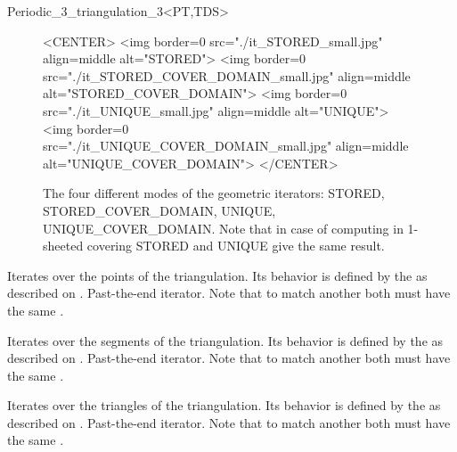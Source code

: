 \begin{ccRefClass}{Periodic_3_triangulation_3<PT,TDS>}
\begin{figure}[htbp]
\begin{ccTexOnly}
\begin{center}
\end{center}
\end{ccTexOnly}
\begin{ccHtmlOnly}
<CENTER>
<img border=0 src="./it_STORED_small.jpg" align=middle
  alt="STORED">
<img border=0 src="./it_STORED_COVER_DOMAIN_small.jpg" align=middle
  alt="STORED_COVER_DOMAIN">
<img border=0 src="./it_UNIQUE_small.jpg" align=middle
  alt="UNIQUE">
<img border=0 src="./it_UNIQUE_COVER_DOMAIN_small.jpg" align=middle
  alt="UNIQUE_COVER_DOMAIN">
</CENTER>
\end{ccHtmlOnly}
\caption{The four different modes of the geometric iterators: STORED,
  STORED\_COVER\_DOMAIN, UNIQUE, UNIQUE\_COVER\_DOMAIN. Note that in
  case of computing in 1-sheeted covering STORED and UNIQUE give the
  same result.
\label{P3Triangulation3-fig-geom_iterators}}
\end{figure} 



{Iterates over the points of the triangulation. Its behavior is
  defined by the   as described on
  .}
\ccGlue
{}
{Past-the-end iterator. Note that to match another
   both must have the same
   .}

{Iterates over the segments of the triangulation. Its behavior is
  defined by the   as described on
  .}
\ccGlue
{}
{Past-the-end iterator. Note that to match another
   both must have the same
   .}

{Iterates over the triangles of the triangulation. Its behavior is
  defined by the   as described on
  .}
\ccGlue
{}
{Past-the-end iterator. Note that to match another
   both must have the same
   .}


\end{ccRefClass}
